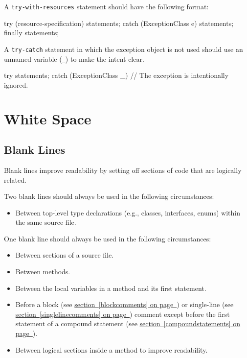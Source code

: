 \documentclass{article}
\begin{document}
A \texttt{try-with-resources} statement should have the following format:

\begin{snippet}
try (resource-specification) {
    statements;
} catch (ExceptionClass e) {
    statements;
} finally {
    statements;
}
\end{snippet}

A \texttt{try-catch} statement in which the exception object is not used should use an unnamed
variable (\texttt{\_}) to make the intent clear.

\begin{snippet}
try {
    statements;
} catch (ExceptionClass _) {
    // The exception is intentionally ignored.
}
\end{snippet}

\section{White Space}

\subsection{Blank Lines}

Blank lines improve readability by setting off sections of code that are logically related.

Two blank lines should always be used in the following circumstances:

\begin{itemize}
\item Between top-level type declarations (e.g., classes, interfaces, enums) within the same source
  file.
\end{itemize}

One blank line should always be used in the following circumstances:

\begin{itemize}
\item Between sections of a source file.
\item Between methods.
\item Between the local variables in a method and its first statement.
\item Before a block (see \hyperref[blockcomments]{section~\ref*{blockcomments} on
  page~\pageref*{blockcomments}}) or single-line (see
  \hyperref[singlelinecomments]{section~\ref*{singlelinecomments} on
  page~\pageref*{singlelinecomments}}) comment except before the first statement of a compound
  statement (see \hyperref[compoundstatements]{section~\ref*{compoundstatements} on
  page~\pageref*{compoundstatements}}).
\item Between logical sections inside a method to improve readability.
\end{itemize}
\end{document}
